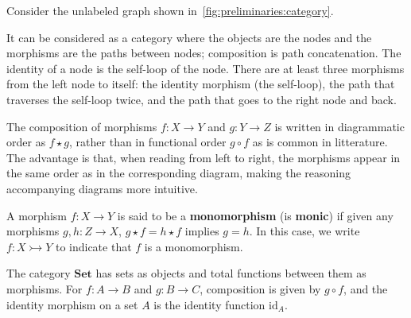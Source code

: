 \begin{example}
    Consider the unlabeled graph shown in~\autoref{fig:preliminaries:category}. 
        \begin{figure}[H]
        \centering
        \caption{}
        \label{fig:preliminaries:category}
    \end{figure}
    It can be considered as a category where the objects are the nodes and the morphisms are the paths between nodes; composition is path concatenation. The identity of a node is the self-loop of the node. There are at least three morphisms from the left node to itself: the identity morphism (the self-loop), the path that traverses the self-loop twice, and the path that goes to the right node and back.
\end{example}

\begin{notation}
    The composition of morphisms \( f : X \to Y \) and \( g : Y \to Z \) is written in diagrammatic order as \( f \star g \), rather than in functional order \( g \circ f \) as is common in litterature. The advantage is that, when reading from left to right, the morphisms appear in the same order as in the corresponding diagram, making the reasoning accompanying diagrams more intuitive. 
\end{notation}  

\begin{definition}[Monomorphism]
    \label{def:cat:homo}
    A morphism \( f : X \to Y \) is said to be a \textbf{monomorphism} (is \textbf{monic}) if given any morphisms \( g,h: Z \to X  \), \( g \star f = h \star f \) implies \( g = h \). 
    In this case, we write $f : X \rightarrowtail Y$ to indicate that $f$ is a monomorphism.
\end{definition} 

\begin{example}
The category \(\mathbf{Set}\) has sets as objects and total functions between them as morphisms. For \(f\colon A\to B\) and \(g\colon B\to C\), composition is given by \(g\circ f\), and the identity morphism on a set \(A\) is the identity function \(\mathrm{id}_A\).
\end{example}

